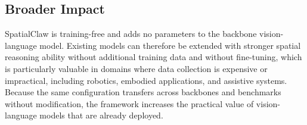 \documentclass{llmxive}
\providecommand{\ours}{SpatialClaw}
\begin{document}
\subsection{Broader Impact}
\label{app:broader_impact}
\ours{} is training-free and adds no parameters to the backbone vision-language model. Existing models can therefore be extended with stronger spatial reasoning ability without additional training data and without fine-tuning, which is particularly valuable in domains where data collection is expensive or impractical, including robotics, embodied applications, and assistive systems. Because the same configuration transfers across backbones and benchmarks without modification, the framework increases the practical value of vision-language models that are already deployed.





\end{document}
